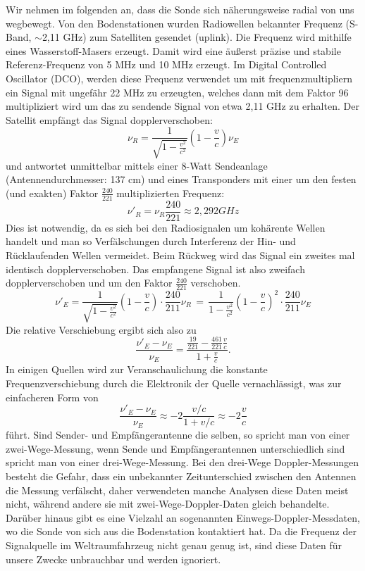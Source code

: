 Wir nehmen im folgenden an, dass die Sonde sich näherungsweise radial von uns wegbewegt.
Von den Bodenstationen wurden Radiowellen bekannter Frequenz (S-Band, $\sim$2,11 GHz) zum Satelliten gesendet (uplink).
Die Frequenz wird mithilfe eines Wasserstoff-Masers erzeugt.
Damit wird eine äußerst präzise und stabile Referenz-Frequenz von 5 MHz und 10 MHz erzeugt. Im Digital Controlled Oscillator (DCO), werden diese Frequenz verwendet um mit frequenzmultipliern ein Signal mit ungefähr 22 MHz zu erzeugten, welches dann mit dem Faktor 96 multipliziert wird um das zu sendende Signal von etwa 2,11 GHz zu erhalten.\cite{Anderson2002}
Der Satellit empfängt das Signal dopplerverschoben:
\begin{equation}
 \nu_R = \frac{1}{\sqrt{1-\frac{v^2}{c^2}}}(1-\frac{v}{c})\nu_E
\end{equation}
und antwortet unmittelbar mittels einer 8-Watt Sendeanlage (Antennendurchmesser: 137 cm\cite{Markwardt2002}) und eines Transponders
mit einer um den festen (und exakten) Faktor $ \frac{240}{221} $ multiplizierten Frequenz:
\begin{equation}
\label{equ:Faktor}
\nu'_R = \nu_R\frac{240}{221} \approx 2,292 GHz
\end{equation}
Dies ist notwendig, da es sich bei den Radiosignalen um kohärente Wellen handelt und man so Verfälschungen durch Interferenz der Hin- und Rücklaufenden Wellen vermeidet.\cite{Anderson2002}
Beim Rückweg wird das Signal ein zweites mal identisch dopplerverschoben.
Das empfangene Signal ist also zweifach dopplerverschoben und um den Faktor $\frac{240}{221}$ verschoben.
\begin{equation}
 \nu'_E = \frac{1}{\sqrt{1-\frac{v^2}{c^2}}}(1-\frac{v}{c}) \cdot \frac{240}{211}\nu_R \, = \,
\frac{1}{1-\frac{v^2}{c^2}}(1-\frac{v}{c})^2 \cdot \frac{240}{211} \nu_E
\end{equation}
Die relative Verschiebung ergibt sich also zu
\begin{equation}
 \frac{\nu'_E-\nu_E}{\nu_E} = \frac{\frac{19}{221}- \frac{461}{221}\frac{v}{c}}{1+\frac{v}{c}}.
\end{equation}
In einigen Quellen wird zur Veranschaulichung die konstante Frequenzverschiebung durch die Elektronik der Quelle vernachlässigt, was zur
einfacheren Form von
\begin{equation}
 \frac{\nu'_E-\nu_E}{\nu_E} \approx -2\frac{v/c}{1+v/c} \approx -2 \frac{v}{c}
\end{equation}
führt.
Sind Sender- und Empfängerantenne die selben, so spricht man von einer zwei-Wege-Messung, wenn Sende und Empfängerantennen unterschiedlich sind spricht man von einer drei-Wege-Messung.\cite{Levy2009} Bei den drei-Wege Doppler-Messungen besteht die Gefahr, dass ein unbekannter Zeitunterschied zwischen den Antennen die Messung verfälscht, daher verwendeten manche Analysen diese Daten meist nicht,\cite{Anderson2002} während andere sie mit zwei-Wege-Doppler-Daten gleich behandelte.\cite{Markwardt2002} Darüber hinaus gibt es eine Vielzahl an sogenannten Einwegs-Doppler-Messdaten, wo die Sonde von sich aus die Bodenstation kontaktiert hat. Da die Frequenz der Signalquelle im Weltraumfahrzeug nicht genau genug ist, sind diese Daten für unsere Zwecke unbrauchbar und werden ignoriert. %

